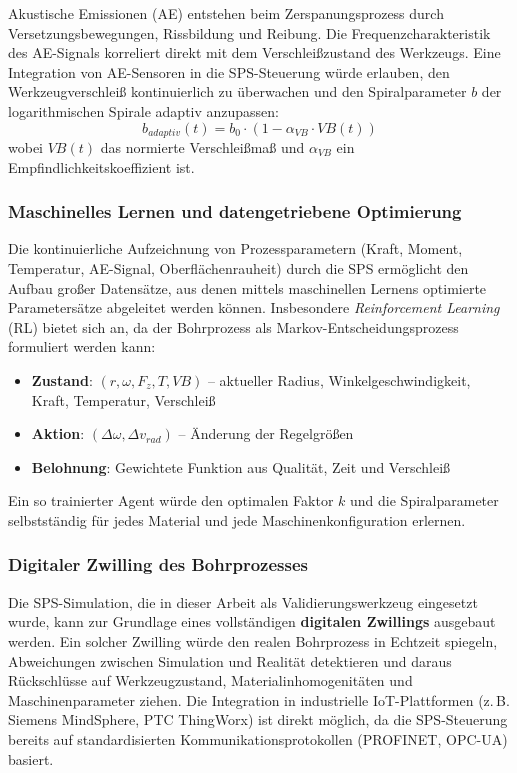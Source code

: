 ﻿\documentclass[12pt,a4paper]{article}
\begin{document}
Akustische Emissionen (AE) entstehen beim Zerspanungsprozess durch Versetzungsbewegungen, Rissbildung und Reibung. Die Frequenzcharakteristik des AE-Signals korreliert direkt mit dem Verschleißzustand des Werkzeugs. Eine Integration von AE-Sensoren in die SPS-Steuerung würde erlauben, den Werkzeugverschleiß kontinuierlich zu überwachen und den Spiralparameter $b$ der logarithmischen Spirale adaptiv anzupassen:
\begin{equation}
    b_{adaptiv}(t) = b_0 \cdot \left(1 - \alpha_{VB} \cdot VB(t)\right)
\end{equation}
wobei $VB(t)$ das normierte Verschleißmaß und $\alpha_{VB}$ ein Empfindlichkeitskoeffizient ist.

\subsubsection{Maschinelles Lernen und datengetriebene Optimierung}

Die kontinuierliche Aufzeichnung von Prozessparametern (Kraft, Moment, Temperatur, AE-Signal, Oberflächenrauheit) durch die SPS ermöglicht den Aufbau großer Datensätze, aus denen mittels maschinellen Lernens optimierte Parametersätze abgeleitet werden können. Insbesondere \textit{Reinforcement Learning} (RL) bietet sich an, da der Bohrprozess als Markov-Entscheidungsprozess formuliert werden kann:
\begin{itemize}
    \item \textbf{Zustand}: $(r, \omega, F_z, T, VB)$ -- aktueller Radius, Winkelgeschwindigkeit, Kraft, Temperatur, Verschleiß
    \item \textbf{Aktion}: $(\Delta\omega, \Delta v_{rad})$ -- Änderung der Regelgrößen
    \item \textbf{Belohnung}: Gewichtete Funktion aus Qualität, Zeit und Verschleiß
\end{itemize}
Ein so trainierter Agent würde den optimalen Faktor $k$ und die Spiralparameter selbstständig für jedes Material und jede Maschinenkonfiguration erlernen.

\subsubsection{Digitaler Zwilling des Bohrprozesses}

Die SPS-Simulation, die in dieser Arbeit als Validierungswerkzeug eingesetzt wurde, kann zur Grundlage eines vollständigen \textbf{digitalen Zwillings} ausgebaut werden. Ein solcher Zwilling würde den realen Bohrprozess in Echtzeit spiegeln, Abweichungen zwischen Simulation und Realität detektieren und daraus Rückschlüsse auf Werkzeugzustand, Materialinhomogenitäten und Maschinenparameter ziehen. Die Integration in industrielle IoT-Plattformen (z.\,B. Siemens MindSphere, PTC ThingWorx) ist direkt möglich, da die SPS-Steuerung bereits auf standardisierten Kommunikationsprotokollen (PROFINET, OPC-UA) basiert.
\end{document}
